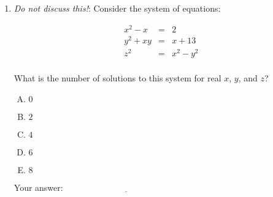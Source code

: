 \documentclass[10pt]{amsart}
\begin{document}
\begin{enumerate}
\item {\em Do not discuss this!}: Consider the system of equations:

  \begin{eqnarray*}
    x^2 - x & = & 2 \\
    y^2 + xy & = & x + 13 \\
    z^2 & = & x^2 - y^2 \\
  \end{eqnarray*}

  What is the number of solutions to this system for real $x$, $y$,
  and $z$?

  \begin{enumerate}[(A)]
  \item $0$
  \item $2$
  \item $4$
  \item $6$
  \item $8$
  \end{enumerate}

  \vspace{0.1in}
  Your answer: $\underline{\qquad\qquad\qquad\qquad\qquad\qquad\qquad}$
  \vspace{0.6in}

\end{enumerate}
\end{document}
